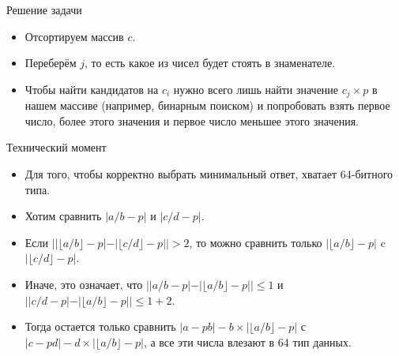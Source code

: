 \begin{frame}[t]{Решение задачи}
\begin{itemize}
    \item Отсортируем массив $c$.
    \item Переберём $j$, то есть какое из чисел будет стоять в знаменателе.
    \item Чтобы найти кандидатов на $c_i$ нужно всего лишь найти значение $c_j \times p$ в нашем массиве (например, бинарным поиском) и попробовать взять первое число,
          более этого значения и первое число меньшее этого значения.
\end{itemize}
\end{frame}

\begin{frame}[t]{Технический момент}
\begin{itemize}
    \item Для того, чтобы корректно выбрать минимальный ответ, хватает 64-битного типа.
    \item Хотим сравнить $|a/b - p|$ и $|c/d - p|$.
    \item Если $| |\lfloor a/b \rfloor - p| - |\lfloor c/d \rfloor - p| | > 2$, то можно сравнить только 
          $|\lfloor a/b \rfloor - p|$ c $|\lfloor c/d \rfloor - p|$.
    \item Иначе, это означает, что $| |a/b - p| - |\lfloor a/b \rfloor - p| | \leq 1$ и $| |c/d - p| - |\lfloor a/b \rfloor - p| | \leq 1 + 2$.
    \item Тогда остается только сравнить 
           $|a - p b| - b \times |\lfloor a/b \rfloor - p|$ с $|c - p d| - d \times |\lfloor a/b \rfloor - p|$, а все эти числа влезают в 64 тип данных.
    
\end{itemize}
\end{frame}